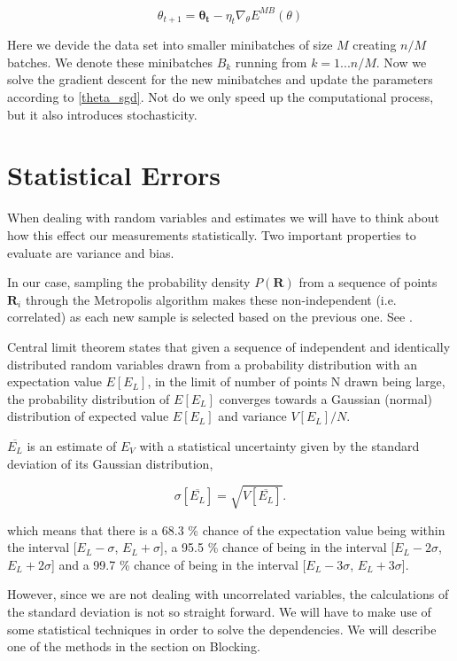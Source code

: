 \begin{equation} \label{theta_sgd}
\theta_{t+1} = \mathbf{\theta_t} - \eta_t \nabla_{\theta} E^{MB} (\theta)
\end{equation}

Here we devide the data set into smaller minibatches of size $M$ creating $n/M$ batches. We denote these minibatches $B_k$ running from $k = 1...n/M$. Now we solve the gradient descent for the new minibatches and update the parameters according to \ref{theta_sgd}. Not do we only speed up the computational process, but it also introduces stochasticity. 


\section{Statistical Errors}

When dealing with random variables and estimates we will have to think about how this effect our measurements statistically. Two important properties to evaluate are variance and bias. 

In our case, sampling the probability density $P(\mathbf{R})$ from a sequence of points $\mathbf{R}_i$ through the Metropolis algorithm makes these non-independent (i.e. correlated) as each new sample is selected based on the previous one. See .

Central limit theorem states that given a sequence of independent and identically distributed random variables drawn from a probability distribution with an expectation value $E[E_L]$, in the limit of number of points N drawn being large, the probability distribution of $E[E_L]$ converges towards a Gaussian (normal) distribution of expected value $E[E_L]$ and variance $V[E_L]/N$.

$\overline{E_L}$ is an estimate of $E_V$ with a statistical uncertainty given by the standard deviation of its Gaussian distribution, 

\begin{equation}
\sigma[\overline{E_L}] = \sqrt{V[\overline{E_L}]}.
\end{equation}

which means that there is a 68.3 \% chance of the expectation value being within the interval [$E_L - \sigma$, $E_L + \sigma$], a 95.5 \% chance of being in the interval [$E_L - 2\sigma$, $E_L + 2\sigma$] and a 99.7 \% chance of being in the interval [$E_L - 3\sigma$, $E_L + 3\sigma$].

However, since we are not dealing with uncorrelated variables, the calculations of the standard deviation is not so straight forward. We will have to make use of some statistical techniques in order to solve the dependencies. We will describe one of the methods in the section on Blocking.

